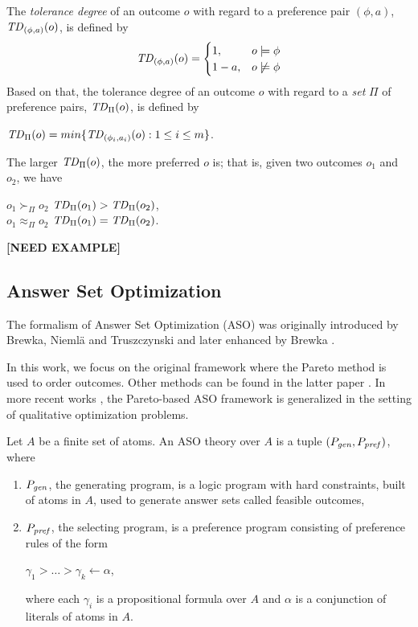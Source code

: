 The \textit{tolerance degree} of an outcome $o$ with regard to a preference 
pair $(\phi,a)$, $\mathit{TD}_{(\phi,a)}(o)$, is defined by
\[
 \mathit{TD}_{(\phi,a)}(o) =
  \begin{cases}
   1, & o \models \phi \\
   1-a, & o \not \models \phi
  \end{cases}
\]
Based on that, the tolerance degree of an outcome $o$ with regard to a \emph{set}
$\Pi$ of preference pairs, $\mathit{TD}_\Pi(o)$, is defined by 
\begin{center}
	$\mathit{TD}_\Pi(o)=min\{\mathit{TD}_{(\phi_i,a_i)}(o):1\leq i \leq m\}$.
\end{center}
The larger $\mathit{TD}_\Pi(o)$, the more preferred $o$ is; that is, 
given two outcomes $o_1$ and $o_2$, we have
\begin{center}
	$o_1 \succ_\Pi o_2$ \itiff $\mathit{TD}_\Pi(o_1) > \mathit{TD}_\Pi(o_2)$,\\
	$o_1 \approx_\Pi o_2$ \itiff $\mathit{TD}_\Pi(o_1) = \mathit{TD}_\Pi(o_2)$.
\end{center}

{\bf [NEED EXAMPLE]}


\subsection{Answer Set Optimization}
The formalism of Answer Set Optimization (ASO) was originally introduced by
Brewka, Nieml\"a and Truszczynski \cite{Brewka03answerset} and
later enhanced by Brewka \cite{Brewka04}.

In this work, we focus on the original framework \cite{Brewka03answerset} where 
the Pareto method is used to order outcomes.
Other methods can be found in the latter paper \cite{Brewka04}.
In more recent works \cite{Faber:QOP,Faber:APF}, 
the Pareto-based ASO framework is generalized in the setting of
qualitative optimization problems.

\begin{definition}
	Let $A$ be a finite set of atoms.
	An ASO theory over $A$ is a tuple $(P_{\mathit{gen}},P_{\mathit{pref}})$, where
	\begin{enumerate} \itemsep -4pt
		\item $P_{\mathit{gen}}$, the generating program, is a logic program
					with hard constraints, built of atoms in $A$,
					used to generate answer sets called feasible outcomes,
		\item $P_{\mathit{pref}}$, the selecting program, is a preference
					program consisting of preference rules of the form
			\begin{center}
				$\gamma_1 > \ldots > \gamma_k \leftarrow \alpha$,
			\end{center}
					where each $\gamma_i$ is a propositional formula
					over $A$ and $\alpha$ is a conjunction of
					literals of atoms in $A$.
	\end{enumerate}
\end{definition}

